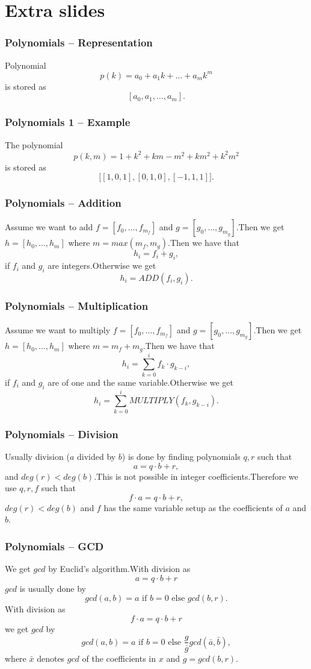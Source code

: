\documentclass{beamer}
\begin{document}
\section*{Extra slides}%
\begin{frame}
  \frametitle{Polynomials -- Representation}
  Polynomial $$p(k)=a_0+a_1k+\ldots+a_mk^m$$ is stored as $$[a_0,a_1,\ldots,a_m].$$
\end{frame}
\begin{frame}
  \frametitle{Polynomials 1 -- Example}
  The polynomial $$p(k,m)=1+k^2+km-m^2+km^2+k^2m^2$$ is stored as $$\Big[[1,0,1],[0,1,0],[-1,1,1]\Big].$$
\end{frame}
\begin{frame}
  \frametitle{Polynomials -- Addition}
  Assume we want to add $f=[f_0,\ldots,f_{m_f}]$ and $g=[g_0,\ldots,g_{m_g}]$.\pause Then we get $h=[h_0,\ldots,h_m]$ where $m=max(m_f,m_g)$.\pause Then we have that
  $$h_i=f_i+g_i,$$
  if $f_i$ and $g_i$ are integers.\pause Otherwise we get
  $$h_i=ADD(f_i,g_i).$$
\end{frame}
\begin{frame}
  \frametitle{Polynomials -- Multiplication}
  Assume we want to multiply $f=[f_0,\ldots,f_{m_f}]$ and $g=[g_0,\ldots,g_{m_g}]$.\pause Then we get $h=[h_0,\ldots,h_m]$ where $m=m_f+m_g$.\pause Then we have that
  $$h_i=\sum_{k=0}^i f_k\cdot g_{k-i},$$
  if $f_i$ and $g_i$ are of one and the same variable.\pause Otherwise we get
  $$h_i=\sum_{k=0}^i MULTIPLY(f_k,g_{k-i}).$$
\end{frame}
\begin{frame}
  \frametitle{Polynomials -- Division}
  Usually division ($a$ divided by $b$) is done by finding polynomials $q,r$ such that $$a=q\cdot b + r,$$
  and $deg(r)<deg(b)$.\pause This is not possible in integer coefficients.\pause Therefore we use $q,r,f$ such that $$f\cdot a=q\cdot b + r,$$ $deg(r)<deg(b)$ and $f$ has the same variable setup as the coefficients of $a$ and $b$.
\end{frame}
\begin{frame}
  \frametitle{Polynomials -- GCD}
  We get $gcd$ by Euclid's algorithm.\pause  With division as $$a=q\cdot b + r$$ $gcd$ is usually done by $$gcd(a,b)=a \text{ if } b=0 \text{ else } gcd(b,r).$$\pause
  With division as $$f\cdot a=q\cdot b + r$$ we get $gcd$ by $$gcd(a,b)=a \text{ if } b=0 \text{ else } \frac{g}{\bar{g}}gcd(\bar{a},\bar{b}),$$ where $\bar{x}$ denotes $gcd$ of the coefficients in $x$ and $g=gcd(b,r)$.
\end{frame}
\end{document}
